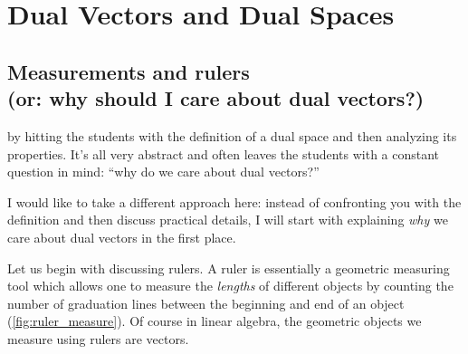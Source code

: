 \section{Dual Vectors and Dual Spaces}

\subsection{Measurements and rulers\\(or: why should I care about dual vectors?)}
 by hitting the students with the definition of a dual space and then analyzing its properties. It's all very abstract and often leaves the students with a constant question in mind: \enquote{why do we care about dual vectors?}

I would like to take a different approach here: instead of confronting you with the definition and then discuss practical details, I will start with explaining \textit{why} we care about dual vectors in the first place.

Let us begin with discussing rulers. A ruler is essentially a geometric measuring tool which allows one to measure the \textit{lengths} of different objects by counting the number of graduation lines between the beginning and end of an object (\cref{fig:ruler_measure}). Of course in linear algebra, the geometric objects we measure using rulers are vectors.

